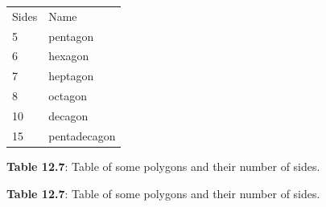           \begin{table}
        \begin{center}
      \label{m39368*uid92}
    \noindent
      \tablelasttail{}
      \begin{xtabular}[t]{|l|l|}\hline
        Sides &
        Name%
     \tabularnewline{}
        5 &
        pentagon%
     \tabularnewline{}
        6 &
        hexagon%
     \tabularnewline{}
        7 &
        heptagon%
     \tabularnewline{}
        8 &
        octagon%
     \tabularnewline{}
        10 &
        decagon%
     \tabularnewline{}
        15 &
        pentadecagon%
     \tabularnewline{}
    \end{xtabular}
      \end{center}
    \begin{center}{\small\bfseries Table 12.7}: Table of some polygons and their number of sides.\end{center}
    \begin{caption}{\small\bfseries Table 12.7}: Table of some polygons and their number of sides.\end{caption}
\end{table}
    \par
    \setcounter{subfigure}{0}
